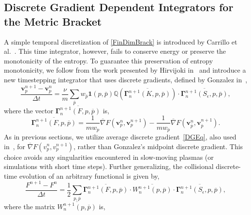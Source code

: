 \documentclass[preprint,12pt]{elsarticle}
\theoremstyle{definition}
\begin{document}

\subsection{Discrete Gradient Dependent Integrators for the Metric Bracket}\label{sec:DGDI}

A simple temporal discretization of \eqref{FinDimBrack} is introduced by Carrillo et al.~\cite{Carrillo2020}. This time integrator, however, fails to conserve energy or preserve the monotonicity of the entropy. To guarantee this preservation of entropy monotonicity, we follow from the work presented by Hirvijoki in~\cite{Eero2020} and introduce a new timestepping integrator that uses discrete gradients, defined by Gonzalez in~\cite{Gonzalez1996},  
\begin{equation}
\frac{\boldsymbol{v}_{p}^{n+1}-\boldsymbol{v}_{p}^{n}}{\Delta t}=\frac{\nu}{m} \sum_{\bar{p}} w_{\bar{p}} \boldsymbol{1}(p, \bar{p}) \mathbb{Q}\left(\overline{\boldsymbol{\Gamma}_{n}^{n+1}(K, p, \bar{p})}\right) \cdot \overline{\boldsymbol{\Gamma}_{n}^{n+1}\left(S_{\epsilon}, p, \bar{p}\right)},
\label{DGColV}
\end{equation}
where the vector $\overline{\boldsymbol{\Gamma}^{n+1}_{n} (F,p,\overline{p})}$ is,
\begin{equation}
\overline{\boldsymbol{\Gamma}_{n}^{n+1}(F, p, \overline{p})}=\frac{1}{m w_{p}} \overline{\nabla} F (\boldsymbol{v}_{p}^{n},\boldsymbol{v}_{p}^{n+1})-\frac{1}{m w_{\overline{p}}} \overline{\nabla} F (\boldsymbol{v}_{\overline{p}}^{n},\boldsymbol{v}_{\overline{p}}^{n+1}).
\label{GammaBar}
\end{equation}
As in previous sections, we utilize average discrete gradient~\eqref{DGEq}, also used in~\cite{Eero2020}, for $\overline{\nabla} F (v_{p}^{n},v_{p}^{n+1})$, rather than Gonzalez's midpoint discrete gradient. This choice avoids any singularities encountered in slow-moving plasmas (or simulations with short time steps). Further generalizing, the collisional discrete-time evolution of an arbitrary functional is given by,
\begin{equation}
\frac{F^{n+1} - F^{n}}{\Delta t} = \frac{1}{2} \sum_{p,\overline{p}} \overline{\boldsymbol{\Gamma}^{n+1}_{n} (F,p,\overline{p})} \cdot \overline{W^{n+1}_{n} (p,\overline{p})} \cdot \overline{\boldsymbol{\Gamma}^{n+1}_{n} (S_{\epsilon},p,\overline{p})},
\label{DGColDTE}
\end{equation}
where the matrix $\overline{W^{n+1}_{n} (p,\overline{p})}$ is,
\end{document}

